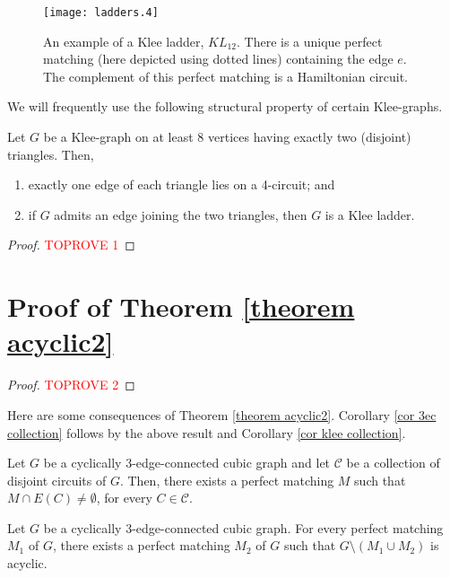 \documentclass[]{theclass}
\begin{document}
\begin{figure}[ht]
      \centering
      \texttt{[image: ladders.4]}
      \caption{An example of a Klee ladder, $KL_{12}$. {There is a unique perfect matching (here depicted using dotted lines) containing the edge $e$.} The complement of this perfect matching is a Hamiltonian circuit.}
      \label{fig:kleeLadder}
\end{figure}



We will frequently use the following structural property of certain Klee-graphs.

\begin{lemma}\label{lemma 4 circuit klee}
Let $G$ be a Klee-graph on at least 8 vertices having exactly two (disjoint) triangles. Then, 
\begin{enumerate}[label=(\roman*)]
    \item exactly one edge of each triangle lies on a 4-circuit; and 
    \item if $G$ admits an edge joining the two triangles, then $G$ is a Klee ladder.
\end{enumerate}
\end{lemma}

\begin{proof}\textcolor{red}{TOPROVE 1}\end{proof}

\section{Proof of Theorem \ref{theorem acyclic2}}

\begin{proof}\textcolor{red}{TOPROVE 2}\end{proof}

Here are some consequences of Theorem \ref{theorem acyclic2}. Corollary \ref{cor 3ec collection} follows by the above result and Corollary \ref{cor klee collection}.

\begin{corollary}\label{cor 3ec collection}
Let $G$ be a cyclically 3-edge-connected cubic graph and let $\mathcal{C}$ be a collection of disjoint circuits of $G$. Then, there exists a perfect matching $M$ such that $M\cap E(C)\neq \emptyset$, for every $C\in\mathcal{C}$.
\end{corollary}

\begin{corollary}
Let $G$ be a cyclically 3-edge-connected cubic graph. For every perfect matching $M_1$ of $G$, there exists a perfect matching $M_2$ of $G$ such that $G\setminus (M_1\cup M_2)$ is acyclic.
\end{corollary}
\end{document}
